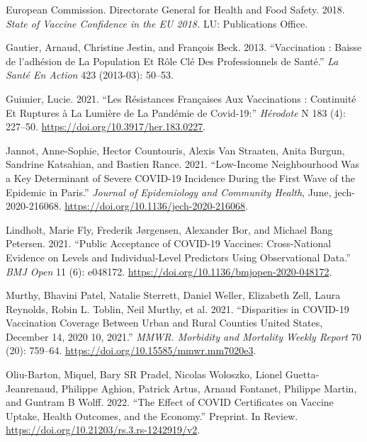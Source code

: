 \documentclass[
]{article}
\newlength{\cslhangindent}
\newlength{\cslentryspacingunit} %
\newenvironment{CSLReferences}[2] %
 {%
  \setlength{\parindent}{0pt}
  \ifodd #1
  \let\oldpar\par
  \def\par{\hangindent=\cslhangindent\oldpar}
  \fi
  \setlength{\parskip}{#2\cslentryspacingunit}
 }%
 {}
\begin{document}
\begin{CSLReferences}{1}{0}
\leavevmode{}%
European Commission. Directorate General for Health and Food Safety.
2018. \emph{State of Vaccine Confidence in the {EU} 2018.} {LU}:
{Publications Office}.

\leavevmode{}%
Gautier, Arnaud, Christine Jestin, and François Beck. 2013.
{``Vaccination : Baisse de l'adhésion de La Population Et Rôle Clé Des
Professionnels de Santé.''} \emph{La Santé En Action} 423 (2013-03):
50--53.

\leavevmode{}%
Guimier, Lucie. 2021. {``Les Résistances Françaises Aux Vaccinations :
Continuité Et Ruptures à La Lumière de La Pandémie de {Covid-19}:''}
\emph{Hérodote} N\textdegree{} 183 (4): 227--50.
\url{https://doi.org/10.3917/her.183.0227}.

\leavevmode{}%
Jannot, Anne-Sophie, Hector Countouris, Alexis Van Straaten, Anita
Burgun, Sandrine Katsahian, and Bastien Rance. 2021. {``Low-Income
Neighbourhood Was a Key Determinant of Severe {COVID-19} Incidence
During the First Wave of the Epidemic in {Paris}.''} \emph{Journal of
Epidemiology and Community Health}, June, jech-2020-216068.
\url{https://doi.org/10.1136/jech-2020-216068}.

\leavevmode{}%
Lindholt, Marie Fly, Frederik Jørgensen, Alexander Bor, and Michael Bang
Petersen. 2021. {``Public Acceptance of {COVID-19} Vaccines:
Cross-National Evidence on Levels and Individual-Level Predictors Using
Observational Data.''} \emph{BMJ Open} 11 (6): e048172.
\url{https://doi.org/10.1136/bmjopen-2020-048172}.

\leavevmode{}%
Murthy, Bhavini Patel, Natalie Sterrett, Daniel Weller, Elizabeth Zell,
Laura Reynolds, Robin L. Toblin, Neil Murthy, et al. 2021.
{``Disparities in {COVID-19 Vaccination Coverage Between Urban} and
{Rural Counties} \textemdash{} {United States}, {December} 14,
2020 10, 2021.''} \emph{MMWR. Morbidity and
Mortality Weekly Report} 70 (20): 759--64.
\url{https://doi.org/10.15585/mmwr.mm7020e3}.

\leavevmode{}%
Oliu-Barton, Miquel, Bary SR Pradel, Nicolas Woloszko, Lionel
Guetta-Jeanrenaud, Philippe Aghion, Patrick Artus, Arnaud Fontanet,
Philippe Martin, and Guntram B Wolff. 2022. {``The Effect of {COVID}
Certificates on Vaccine Uptake, Health Outcomes, and the Economy.''}
Preprint. {In Review}.
\url{https://doi.org/10.21203/rs.3.rs-1242919/v2}.


\end{CSLReferences}
\end{document}
